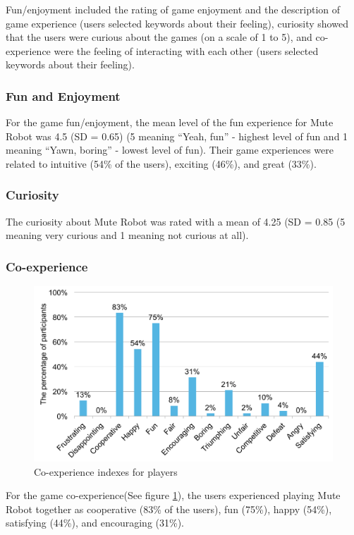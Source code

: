 \documentclass{sigchi}
\begin{document}
Fun/enjoyment included the rating of game enjoyment and the description of game experience (users selected keywords about their feeling), curiosity showed that the users were curious about the games (on a scale of 1 to 5), and co-experience were the feeling of interacting with each other (users selected keywords about their feeling).

\subsubsection{Fun and Enjoyment}
For the game fun/enjoyment, the mean level of the fun experience for Mute Robot was 4.5 (SD = 0.65) (5 meaning “Yeah, fun” - highest level of fun and 1 meaning “Yawn, boring” - lowest level of fun). Their game experiences were related to intuitive (54\% of the users), exciting (46\%), and great (33\%). 

\subsubsection{Curiosity}
The curiosity about Mute Robot was rated with a mean of 4.25 (SD = 0.85 (5 meaning very curious and 1 meaning not curious at all).

\subsubsection{Co-experience}

\begin{figure}[!h]
\centering
\includegraphics[width=1.0\columnwidth]{Figures/US_F1.pdf}
\caption{Co-experience indexes for players}
\label{fig:US_F1}
\end{figure}

For the game co-experience(See figure \ref{fig:US_F1}), the users experienced playing Mute Robot together as cooperative (83\% of the users), fun (75\%), happy (54\%), satisfying (44\%), and encouraging (31\%). 
\end{document}
